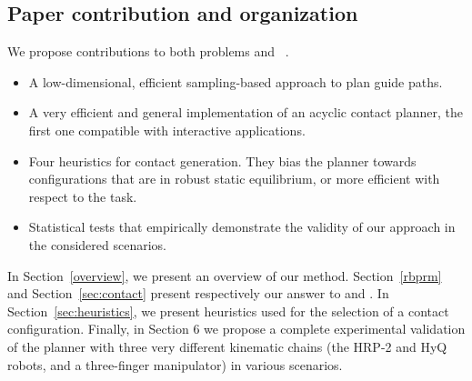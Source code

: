 \subsection{Paper contribution and organization}
We propose contributions to both problems \Pa and \Pb~.
\begin{itemize}
\item A low-dimensional, efficient sampling-based approach to plan guide paths.
\item A very efficient and general implementation of an acyclic contact planner, the first one compatible with \gls{interactive} applications.
\item Four heuristics for contact generation. They bias the planner towards configurations that are in robust static equilibrium, or 
more efficient with respect to the task.
\item Statistical tests that empirically demonstrate the validity of our approach in the considered scenarios. 
\end{itemize}



In Section~\ref{overview}, we present an overview of our method. Section~\ref{rbprm} and Section~\ref{sec:contact} present respectively our answer to \Pa and \Pb. In Section~\ref{sec:heuristics}, we present heuristics used for the selection of a contact configuration. Finally, in Section 6 we propose a complete experimental validation of the planner with three very different kinematic chains (the HRP-2 and HyQ robots, and a three-finger manipulator) in various scenarios.

